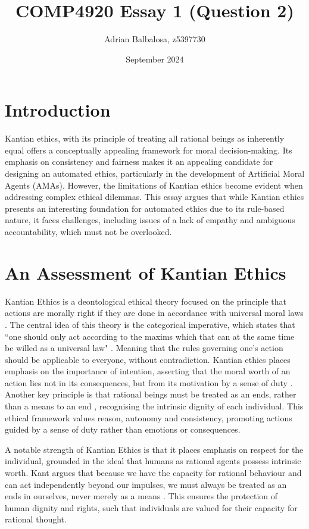 \documentclass{article}
\title{COMP4920 Essay 1 (Question 2)}
\author{Adrian Balbalosa, z5397730}
\date{September 2024}
\begin{document}
\maketitle

\section{Introduction}
Kantian ethics, with its principle of treating all rational beings as inherently equal
offers a conceptually appealing framework for moral decision-making. Its emphasis
on consistency and fairness makes it an appealing candidate for designing an automated
ethics, particularly in the development of Artificial Moral Agents (AMAs). However, the
limitations of Kantian ethics become evident when addressing complex ethical dilemmas. This
essay argues that while Kantian ethics presents an interesting foundation for 
automated ethics due to its rule-based nature, it faces challenges, including issues
of a lack of empathy and ambiguous accountability, which must not be overlooked.

\section{An Assessment of Kantian Ethics}
Kantian Ethics is a deontological ethical theory focused on the principle that 
actions are morally right if they are done in accordance with universal 
moral laws \parencite[p. 426]{tonkens2009}. The central idea of this theory
is the categorical imperative, which states that ``one should only act
according to the maxims which that can at the same time be willed as
a universal law" \parencite[p. 427]{tonkens2009}. Meaning that the rules
governing one's action should be applicable to everyone, without contradiction.
Kantian ethics places emphasis on the importance of intention, asserting that
the moral worth of an action lies not in its consequences, but from its motivation
by a sense of duty \parencite[p. 428]{tonkens2009}. Another key principle
is that rational beings must be treated as an ends, rather than a means to 
an end \parencite[p. 427]{tonkens2009}, recognising the intrinsic dignity
of each individual. This ethical framework values reason, autonomy and consistency, promoting
actions guided by a sense of duty rather than emotions or consequences.

A notable strength of Kantian Ethics is that it places emphasis on respect
for the individual, grounded in the ideal that humans as rational agents possess intrinsic worth. Kant 
argues that because we have the capacity for rational behaviour and can act independently beyond our
impulses, we must always be treated as an ends in ourselves, never merely as a means \parencite[p. 77]{bennet2015}. 
This ensures the protection of human dignity and rights, such that individuals are valued for their
capacity for rational thought.
\end{document}
